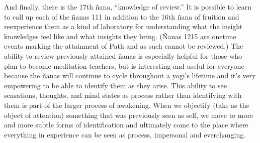 \documentclass[a5paper,10pt,english]{book}
\begin{document}
\sphinxAtStartPar
And finally, there is the 17th ñana, “knowledge of review.” It is
possible to learn to call up each of the ñanas 1\sphinxhyphen{}11 in addition to the
16th ñana of fruition and re\sphinxhyphen{}experience them as a kind of laboratory for
understanding what the insight knowledges feel like and what insights
they bring. (Ñanas 12\sphinxhyphen{}15 are one\sphinxhyphen{}time events marking the attainment of
Path and as such cannot be reviewed.) The ability to review previously
attained ñanas is especially helpful for those who plan to become
meditation teachers, but is interesting and useful for everyone because
the ñanas will continue to cycle throughout a yogi’s lifetime and it’s
very empowering to be able to identify them as they arise. This ability
to see sensations, thoughts, and mind states as process rather than
identifying with them is part of the larger process of awakening. When
we objectify (take as the object of attention) something that was
previously seen as self, we move to more and more subtle forms of
identification and ultimately come to the place where everything in
experience can be seen as process, impersonal and ever\sphinxhyphen{}changing.
\end{document}
